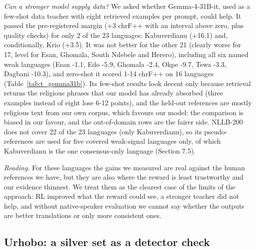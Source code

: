 \emph{Can a stronger model supply data?} We asked whether Gemma-4-31B-it, used as a few-shot data teacher with eight retrieved examples per prompt, could help. It passed the pre-registered margin (+3 chrF++ with an interval above zero, plus quality checks) for only 2 of the 23 languages: Kabuverdianu (+16.1) and, conditionally, Krio (+3.5). It was not better for the other 21 (clearly worse for 17, level for Esan, Ghomala, South Ndebele and Herero), including all six named weak languages (Esan -1.1, Edo -5.9, Ghomala -2.4, Okpe -9.7, Tswa -3.3, Dagbani -10.3), and zero-shot it scored 1-14 chrF++ on 16 languages (Table~\ref{tab:t_gemma31b}). Its few-shot results look decent only because retrieval returns the religious phrases that our model has already absorbed (three examples instead of eight lose 6-12 points), and the held-out references are mostly religious text from our own corpus, which favours our model: the comparison is biased in our favour, and the out-of-domain rows are the fairer side. NLLB-200 does not cover 22 of the 23 languages (only Kabuverdianu), so its pseudo-references are used for five covered weak-signal languages only, of which Kabuverdianu is the one consensus-only language (Section 7.5).

\emph{Reading.} For these languages the gains we measured are real against the human references we have, but they are also where the reward is least trustworthy and our evidence thinnest. We treat them as the clearest case of the limits of the approach: RL improved what the reward could see, a stronger teacher did not help, and without native-speaker evaluation we cannot say whether the outputs are better translations or only more consistent ones.

\subsection{Urhobo: a silver set as a detector check}\label{urhobo-a-silver-set-as-a-detector-check}

